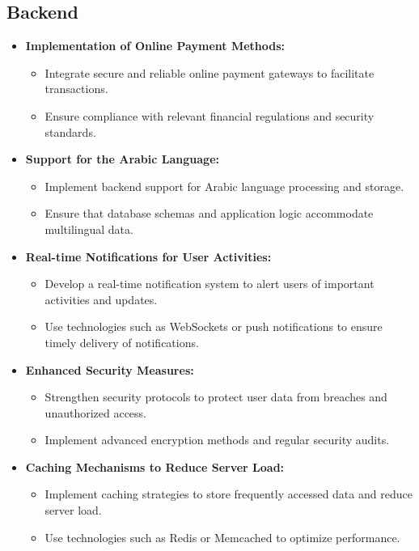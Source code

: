 \subsection{Backend}
\begin{itemize}
    \item \textbf{Implementation of Online Payment Methods:}
    \begin{itemize}
        \item Integrate secure and reliable online payment gateways to facilitate transactions.
        \item Ensure compliance with relevant financial regulations and security standards.
    \end{itemize}
    
    \item \textbf{Support for the Arabic Language:}
    \begin{itemize}
        \item Implement backend support for Arabic language processing and storage.
        \item Ensure that database schemas and application logic accommodate multilingual data.
    \end{itemize}
    
    \item \textbf{Real-time Notifications for User Activities:}
    \begin{itemize}
        \item Develop a real-time notification system to alert users of important activities and updates.
        \item Use technologies such as WebSockets or push notifications to ensure timely delivery of notifications.
    \end{itemize}
    
    \item \textbf{Enhanced Security Measures:}
    \begin{itemize}
        \item Strengthen security protocols to protect user data from breaches and unauthorized access.
        \item Implement advanced encryption methods and regular security audits.
    \end{itemize}
    
    \item \textbf{Caching Mechanisms to Reduce Server Load:}
    \begin{itemize}
        \item Implement caching strategies to store frequently accessed data and reduce server load.
        \item Use technologies such as Redis or Memcached to optimize performance.
    \end{itemize}
    

\end{itemize}
